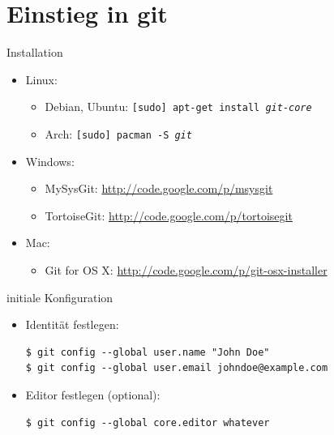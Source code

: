\section{Einstieg in git}

\begin{frame}
  \tableofcontents[currentsection]
\end{frame}

\begin{frame}{Installation}
  \begin{itemize}
    \item Linux:
    \begin{itemize}
      \item Debian, Ubuntu: \texttt{[sudo] apt-get install \textit{git-core}}
      \item Arch: \texttt{[sudo] pacman -S \textit{git}}
    \end{itemize}
    \item Windows:
    \begin{itemize}
      \item MySysGit: \url{http://code.google.com/p/msysgit}
      \item TortoiseGit: \url{http://code.google.com/p/tortoisegit}
    \end{itemize}
    \item Mac:
    \begin{itemize}
      \item Git for OS X: \url{http://code.google.com/p/git-osx-installer}
    \end{itemize}
  \end{itemize}
\end{frame}

\begin{frame}[fragile]{initiale Konfiguration}
  \begin{itemize}
    \item Identität festlegen:
    \begin{lstlisting}
$ git config --global user.name "John Doe"
$ git config --global user.email johndoe@example.com
    \end{lstlisting}
    \item Editor festlegen (optional):
    \begin{lstlisting}
$ git config --global core.editor whatever
    \end{lstlisting}
    \end{itemize}
\end{frame}

